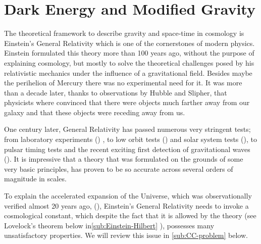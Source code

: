 
\chapter{Dark Energy and Modified Gravity \label{chap:DE-MG-Overview}} %



\newcommand{\keyword}[1]{\textbf{#1}}
\newcommand{\tabhead}[1]{\textbf{#1}}
\newcommand{\code}[1]{\texttt{#1}}
\newcommand{\file}[1]{\texttt{\bfseries#1}}
\newcommand{\option}[1]{\texttt{\itshape#1}}

%

The theoretical framework to describe gravity and space-time in cosmology is Einstein's General Relativity which is
one of the cornerstones of modern physics.
Einstein formulated this theory more than 100 years ago, without the purpose
of explaining cosmology, but mostly to solve the theoretical challenges posed by his relativistic mechanics under the influence of a gravitational field. Besides maybe the
perihelion of Mercury there was no experimental need for it. It was more than a decade later, thanks to observations
by Hubble and Slipher, that physicists where convinced that there were objects much farther away from
our galaxy and that these objects were receding away from us.


One century later, General Relativity has passed numerous very stringent tests; from laboratory experiments (\cite{cite}) , to
low orbit tests (\cite{cite}) and solar system tests (\cite{cite}), to pulsar timing tests and the recent
exciting first detection of gravitational waves (\cite{cite}).
It is impressive that a theory that was formulated on the grounds of some very basic
principles, has proven to be so accurate across several orders of magnitude in scales.

To explain the accelerated expansion of the Universe, which was observationally verified almost 20 years ago,
(\cite{cite, supernova, 1998}), Einstein's General Relativity needs to invoke a cosmological constant, which despite the fact that
it is allowed by the theory (see Lovelock's theorem below in\cref{sub:Einstein-Hilbert} ),
possesses many unsatisfactory properties. 
We will review this issue in \cref{sub:CC-problem} below.

